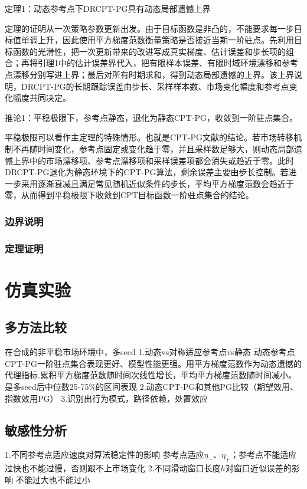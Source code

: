 \documentclass{sufethesismas}
\begin{document}
定理1：动态参考点下DRCPT-PG具有动态局部遗憾上界

定理的证明从一次策略参数更新出发。由于目标函数是非凸的，不能要求每一步目标值单调上升，因此使用平方梯度范数衡量策略是否接近当期一阶驻点。先利用目标函数的光滑性，把一次更新带来的改进写成真实梯度、估计误差和步长项的组合；再将引理1中的估计误差界代入，把有限样本误差、有限时域环境漂移和参考点漂移分别写进上界；最后对所有时期求和，得到动态局部遗憾的上界。该上界说明，DRCPT-PG的长期跟踪误差由步长、采样样本数、市场变化幅度和参考点变化幅度共同决定。

推论1：平稳极限下，参考点静态，退化为静态CPT-PG，收敛到一阶驻点集合。

平稳极限可以看作主定理的特殊情形。也就是CPT-PG文献的结论。若市场转移机制不再随时间变化，参考点固定或变化趋于零，并且采样数足够大，则动态局部遗憾上界中的市场漂移项、参考点漂移项和采样误差项都会消失或趋近于零。此时DRCPT-PG退化为静态环境下的CPT-PG算法，剩余误差主要由步长控制。若进一步采用逐渐衰减且满足常见随机近似条件的步长，平均平方梯度范数会趋近于零，从而得到平稳极限下收敛到CPT目标函数一阶驻点集合的结论。

\subsection{边界说明}


\subsection{定理证明}







\chapter{仿真实验}
\section{多方法比较}
在合成的非平稳市场环境中，多seed
1.动态vs对称适应参考点vs静态
动态参考点CPT-PG一阶驻点集合表现更好、模型性能更强。用平方梯度范数作为动态遗憾的代理指标.累积平方梯度范数随时间次线性增长，平均平方梯度范数随时间减小。是多seed后中位数25-75\%的区间表现
2.动态CPT-PG和其他PG比较（期望效用、指数效用PG）
3.识别出行为模式，路径依赖，处置效应
\section{敏感性分析}
1.不同参考点适应速度对算法稳定性的影响
参考点适应$\eta_-$、$\eta_+$；参考点不能适应过快也不能过慢，否则跟不上市场变化
2.不同滑动窗口长度$h$对窗口近似误差的影响
不能过大也不能过小 
\end{document}
